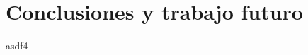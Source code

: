\documentclass[a4paper]{article}
\begin{document}
%
\newpage

\newpage

\newpage

\newpage

\newpage
\section{Conclusiones y trabajo futuro}
asdf4
\end{document}
